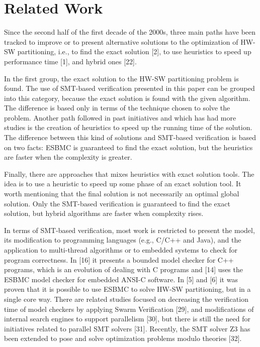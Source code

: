 \section{Related Work}
Since the second half of the first decade of the 2000s, three main paths have been tracked to improve or to present alternative solutions to the optimization of HW-SW partitioning, i.e., to find the exact solution [2], to use heuristics to speed up performance time [1], and hybrid ones [22].

In the first group, the exact solution to the HW-SW partitioning problem is found. The use of SMT-based verification presented in this paper can be grouped into this category, because the exact solution is found with the given algorithm. The difference is based only in terms of the technique chosen to solve the problem.
Another path followed in past initiatives and which has had more studies is the creation of heuristics to speed up the running time of the solution. The difference between this kind of solutions and SMT-based verification is based on two facts: ESBMC is guaranteed to find the exact solution, but the heuristics are faster when the complexity is greater.

Finally, there are approaches that mixes heuristics with exact solution tools. The idea is to use a heuristic to speed up some phase of an exact solution tool. It worth mentioning that the final solution is not necessarily an optimal global solution. Only the SMT-based verification is guaranteed to find the exact solution, but hybrid algorithms are faster when complexity rises.

In terms of SMT-based verification, most work is restricted to present the model, its modification to programming languages (e.g., C/C++ and Java), and the application to multi-thread algorithms or to embedded systems to check for program correctness. In [16] it presents a bounded model checker for C++ programs, which is an evolution of dealing with C programs and [14] uses the ESBMC model checker for embedded ANSI-C software. In [5] and [6] it was proven that it is possible to use ESBMC to solve HW-SW partitioning, but in a single core way. There are related studies focused on decreasing the verification time of model checkers by applying Swarm Verification [29], and modifications of internal search engines to support parallelism [30], but there is still the need for initiatives related to parallel SMT solvers [31]. Recently, the SMT solver Z3 has been extended to pose and solve optimization problems modulo theories [32].
